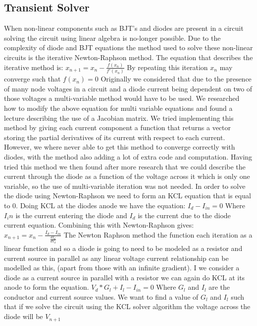 \documentclass{article}
\begin{document}
\subsection{Transient Solver}
When non-linear components such as BJT's and diodes are present in a circuit solving the circuit using linear algebra is no-longer possible. Due to the complexity of diode and BJT equations the method used to solve these non-linear circuits is the iterative Newton-Raphson method. The equation that describes the iterative method is:
\bigbreak $x_{n+1} = x_n - \frac{f(x_n)}{f'(x_n)}$\bigbreak
By repeating this iteration $x_n$ may converge such that $f(x_n) = 0$
Originally we considered that due to the presence of many node voltages in a circuit and a diode current being dependent on two of those voltages a multi-variable method would have to be used. We researched how to modify the above equation for multi variable equations and found a lecture\cite{mulitvariableNR} describing the use of a Jacobian matrix. We tried implementing this method by giving each current component a function that returns a vector storing the partial derivatives of its current with respect to each current. However, we where never able to get this method to converge correctly with diodes, with the method also adding a lot of extra code and computation. Having tried this method we then found after more research that we could describe the current through the diode as a function of the voltage across it which is only one variable\cite{LinearCompanionModels}, so the use of multi-variable iteration was not needed. In order to solve the diode using Newton-Raphson we need to form an KCL equation that is equal to 0. Doing KCL at the diodes anode we have the equation:
\bigbreak $I_d - I_{in} = 0$\bigbreak
Where $I_in$ is the current entering the diode and $I_d$ is the current due to the diode current equation. Combining this with Newton-Raphson gives:
\bigbreak $x_{n+1} = x_n - \frac{I_d - I_{in}}{\frac{d I_d}{d V_d}}$\bigbreak
The Newton Raphson method the function each iteration as a linear function and so a diode is going to need to be modeled as a resistor and current source in parallel as any linear voltage current relationship can be modelled as this, (apart from those with an infinite gradient). I we consider a diode as a current source in parallel with a resistor we can again do KCL at its anode to form the equation. 
\bigbreak $V_d*G_l + I_l - I_{in} = 0$ Where $G_l$ and $I_l$ are the conductor and current source values.\bigbreak
We want to find a value of $G_l$ and $I_l$ such that if we solve the circuit using the KCL solver algorithm the voltage across the diode will be $V_{n+1}$
\end{document}
